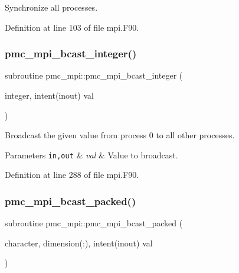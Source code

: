 Synchronize all processes. 



Definition at line 103 of file mpi.\+F90.

\mbox{\label{namespacepmc__mpi_a8c5c43ef03395c028808ccc21c6afb1b}} 
\subsubsection{\texorpdfstring{pmc\+\_\+mpi\+\_\+bcast\+\_\+integer()}{pmc\_mpi\_bcast\_integer()}}
{\footnotesize\ttfamily subroutine pmc\+\_\+mpi\+::pmc\+\_\+mpi\+\_\+bcast\+\_\+integer (\begin{DoxyParamCaption}\item[{integer, intent(inout)}]{val }\end{DoxyParamCaption})}



Broadcast the given value from process 0 to all other processes. 


\begin{DoxyParams}[1]{Parameters}
\mbox{\tt in,out}  & {\em val} & Value to broadcast. \\
\hline
\end{DoxyParams}


Definition at line 288 of file mpi.\+F90.

\mbox{\label{namespacepmc__mpi_aa53168e6f5f0abea92823b4254e57f70}} 
\subsubsection{\texorpdfstring{pmc\+\_\+mpi\+\_\+bcast\+\_\+packed()}{pmc\_mpi\_bcast\_packed()}}
{\footnotesize\ttfamily subroutine pmc\+\_\+mpi\+::pmc\+\_\+mpi\+\_\+bcast\+\_\+packed (\begin{DoxyParamCaption}\item[{character, dimension(\+:), intent(inout)}]{val }\end{DoxyParamCaption})}



